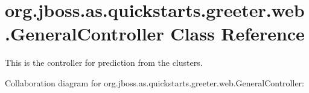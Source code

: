 \hypertarget{classorg_1_1jboss_1_1as_1_1quickstarts_1_1greeter_1_1web_1_1_general_controller}{}\section{org.\+jboss.\+as.\+quickstarts.\+greeter.\+web.\+General\+Controller Class Reference}
\label{classorg_1_1jboss_1_1as_1_1quickstarts_1_1greeter_1_1web_1_1_general_controller}


This is the controller for prediction from the clusters.  




Collaboration diagram for org.\+jboss.\+as.\+quickstarts.\+greeter.\+web.\+General\+Controller\+:
